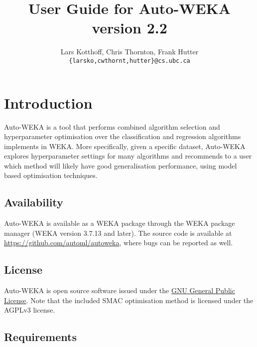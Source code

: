 \documentclass{article}
\def\version{2.2}
\begin{document}
\title{User Guide for Auto-WEKA version \version}

\author{
Lars Kotthoff, Chris Thornton, Frank Hutter\\
\texttt{\{larsko,cwthornt,hutter\}@cs.ubc.ca}
}

\maketitle

\tableofcontents

\section{Introduction}\label{sec:intro}

Auto-WEKA is a tool that performs combined algorithm selection and hyperparameter
optimisation over the classification and regression algorithms implements in
WEKA. More specifically, given a specific dataset, Auto-WEKA explores
hyperparameter settings for many algorithms and recommends to a user which
method will likely have good generalisation performance, using model based
optimisation techniques.

\subsection{Availability}

Auto-WEKA is available as a WEKA package through the WEKA package manager (WEKA
version 3.7.13 and later). The source code is available at
\url{https://github.com/automl/autoweka}, where bugs can be reported as
well.

\subsection{License}

Auto-WEKA is open source software issued under the
\href{http://www.gnu.org/licenses/gpl.html}{GNU General Public License}. Note
that the included SMAC optimisation method is licensed under the AGPLv3 license.

\subsection{Requirements}
\end{document}
